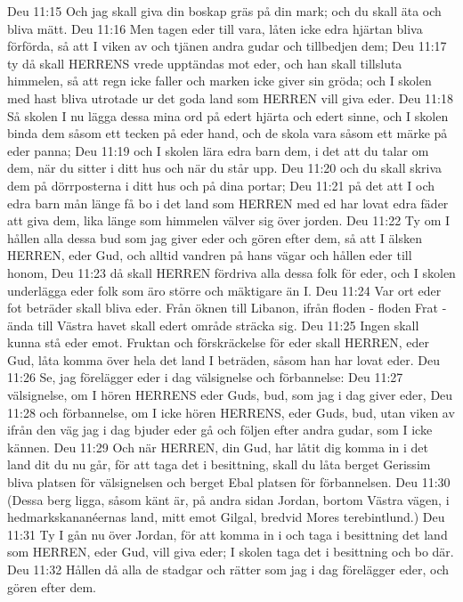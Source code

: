 Deu 11:15  Och jag skall giva din boskap gräs på din mark; och du skall äta och bliva mätt.
Deu 11:16  Men tagen eder till vara, låten icke edra hjärtan bliva förförda, så att I viken av och tjänen andra gudar och tillbedjen dem;
Deu 11:17  ty då skall HERRENS vrede upptändas mot eder, och han skall tillsluta himmelen, så att regn icke faller och marken icke giver sin gröda; och I skolen med hast bliva utrotade ur det goda land som HERREN vill giva eder.
Deu 11:18  Så skolen I nu lägga dessa mina ord på edert hjärta och edert sinne, och I skolen binda dem såsom ett tecken på eder hand, och de skola vara såsom ett märke på eder panna;
Deu 11:19  och I skolen lära edra barn dem, i det att du talar om dem, när du sitter i ditt hus och när du står upp.
Deu 11:20  och du skall skriva dem på dörrposterna i ditt hus och på dina portar;
Deu 11:21  på det att I och edra barn mån länge få bo i det land som HERREN med ed har lovat edra fäder att giva dem, lika länge som himmelen välver sig över jorden.
Deu 11:22  Ty om I hållen alla dessa bud som jag giver eder och gören efter dem, så att I älsken HERREN, eder Gud, och alltid vandren på hans vägar och hållen eder till honom,
Deu 11:23  då skall HERREN fördriva alla dessa folk för eder, och I skolen underlägga eder folk som äro större och mäktigare än I.
Deu 11:24  Var ort eder fot beträder skall bliva eder. Från öknen till Libanon, ifrån floden - floden Frat - ända till Västra havet skall edert område sträcka sig.
Deu 11:25  Ingen skall kunna stå eder emot. Fruktan och förskräckelse för eder skall HERREN, eder Gud, låta komma över hela det land I beträden, såsom han har lovat eder.
Deu 11:26  Se, jag förelägger eder i dag välsignelse och förbannelse:
Deu 11:27  välsignelse, om I hören HERRENS eder Guds, bud, som jag i dag giver eder,
Deu 11:28  och förbannelse, om I icke hören HERRENS, eder Guds, bud, utan viken av ifrån den väg jag i dag bjuder eder gå och följen efter andra gudar, som I icke kännen.
Deu 11:29  Och när HERREN, din Gud, har låtit dig komma in i det land dit du nu går, för att taga det i besittning, skall du låta berget Gerissim bliva platsen för välsignelsen och berget Ebal platsen för förbannelsen.
Deu 11:30  (Dessa berg ligga, såsom känt är, på andra sidan Jordan, bortom Västra vägen, i hedmarkskananéernas land, mitt emot Gilgal, bredvid Mores terebintlund.)
Deu 11:31  Ty I gån nu över Jordan, för att komma in i och taga i besittning det land som HERREN, eder Gud, vill giva eder; I skolen taga det i besittning och bo där.
Deu 11:32  Hållen då alla de stadgar och rätter som jag i dag förelägger eder, och gören efter dem.
